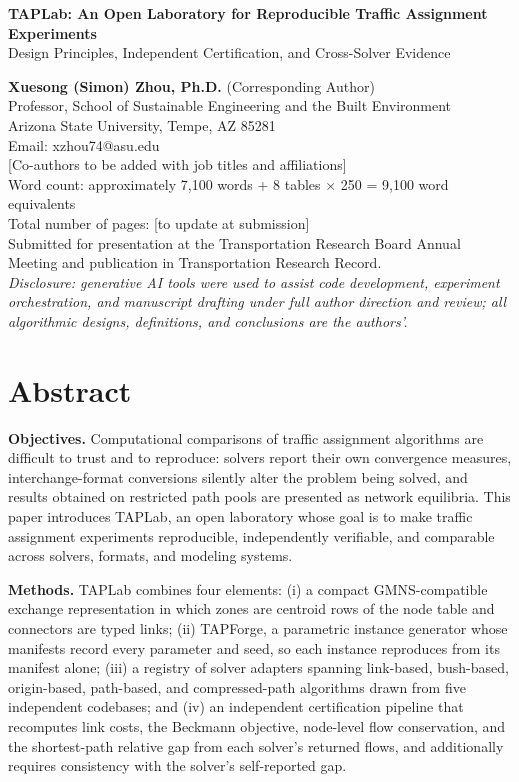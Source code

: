 \documentclass[11pt]{article}
\begin{document}
\begin{center}
{\Large\bfseries TAPLab: An Open Laboratory for Reproducible Traffic
Assignment Experiments}\\[6pt]
{\large Design Principles, Independent Certification, and Cross-Solver
Evidence}\\[18pt]
\end{center}

\textbf{Xuesong (Simon) Zhou, Ph.D.} (Corresponding Author)\\
Professor, School of Sustainable Engineering and the Built Environment\\
Arizona State University, Tempe, AZ 85281\\
Email: xzhou74@asu.edu\\[8pt]
[Co-authors to be added with job titles and affiliations]\\[16pt]

Word count: approximately 7{,}100 words + 8 tables $\times$ 250 = 9{,}100
word equivalents\\
Total number of pages: [to update at submission]\\[8pt]
Submitted for presentation at the Transportation Research Board Annual
Meeting and publication in Transportation Research Record.\\[8pt]
\textit{Disclosure: generative AI tools were used to assist code
development, experiment orchestration, and manuscript drafting under full
author direction and review; all algorithmic designs, definitions, and
conclusions are the authors'.}

\newpage
\section*{Abstract}
\textbf{Objectives.} Computational comparisons of traffic assignment
algorithms are difficult to trust and to reproduce: solvers report their own
convergence measures, interchange-format conversions silently alter the
problem being solved, and results obtained on restricted path pools are
presented as network equilibria. This paper introduces TAPLab, an open
laboratory whose goal is to make traffic assignment experiments
reproducible, independently verifiable, and comparable across solvers,
formats, and modeling systems.

\textbf{Methods.} TAPLab combines four elements: (i) a compact
GMNS-compatible exchange representation in which zones are centroid rows of
the node table and connectors are typed links; (ii) TAPForge, a parametric
instance generator whose manifests record every parameter and seed, so each
instance reproduces from its manifest alone; (iii) a registry of solver
adapters spanning link-based, bush-based, origin-based, path-based, and
compressed-path algorithms drawn from five independent codebases; and
(iv) an independent certification pipeline that recomputes link costs, the
Beckmann objective, node-level flow conservation, and the shortest-path
relative gap from each solver's returned flows, and additionally requires
consistency with the solver's self-reported gap.
\end{document}
